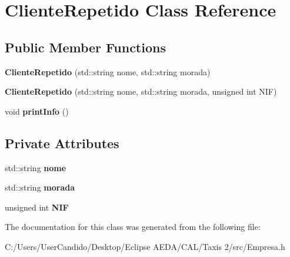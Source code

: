 \hypertarget{class_cliente_repetido}{}\section{Cliente\+Repetido Class Reference}
\label{class_cliente_repetido}
\subsection*{Public Member Functions}
\begin{DoxyCompactItemize}
\item 
\hypertarget{class_cliente_repetido_a9cea00e5f8ccbdc17b1255c18b0db76a}{}\label{class_cliente_repetido_a9cea00e5f8ccbdc17b1255c18b0db76a} 
{\bfseries Cliente\+Repetido} (std\+::string nome, std\+::string morada)
\item 
\hypertarget{class_cliente_repetido_aef162764c8915bc8b828819810dfb244}{}\label{class_cliente_repetido_aef162764c8915bc8b828819810dfb244} 
{\bfseries Cliente\+Repetido} (std\+::string nome, std\+::string morada, unsigned int N\+IF)
\item 
\hypertarget{class_cliente_repetido_aaf0c377313c9c28280c9f31c2e390f9c}{}\label{class_cliente_repetido_aaf0c377313c9c28280c9f31c2e390f9c} 
void {\bfseries print\+Info} ()
\end{DoxyCompactItemize}
\subsection*{Private Attributes}
\begin{DoxyCompactItemize}
\item 
\hypertarget{class_cliente_repetido_a2456d62012c9fb5059eb3e55563ba73d}{}\label{class_cliente_repetido_a2456d62012c9fb5059eb3e55563ba73d} 
std\+::string {\bfseries nome}
\item 
\hypertarget{class_cliente_repetido_af103299aa577b7be308b4acfa394805f}{}\label{class_cliente_repetido_af103299aa577b7be308b4acfa394805f} 
std\+::string {\bfseries morada}
\item 
\hypertarget{class_cliente_repetido_a3741557d88f69acdec3ef7c7a1f47fe6}{}\label{class_cliente_repetido_a3741557d88f69acdec3ef7c7a1f47fe6} 
unsigned int {\bfseries N\+IF}
\end{DoxyCompactItemize}


The documentation for this class was generated from the following file\+:\begin{DoxyCompactItemize}
\item 
C\+:/\+Users/\+User\+Candido/\+Desktop/\+Eclipse A\+E\+D\+A/\+C\+A\+L/\+Taxis 2/src/Empresa.\+h\end{DoxyCompactItemize}
